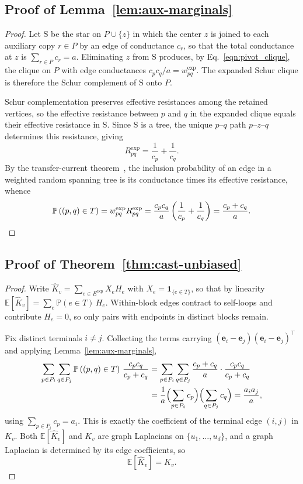 \documentclass{article}
\newcommand{\1}{\mathbbm{1}}
\theoremstyle{plain}
\renewcommand{\Pr}[1]{\mathbb{P}\left(#1\right)}
\begin{document}
\subsection{Proof of Lemma~\ref{lem:aux-marginals}}
\label{app:aux_marginals}
\begin{proof}
Let $\mathrm{S}$ be the star on $P\cup\{z\}$ in which the center $z$
is joined to each auxiliary copy $r\in P$ by an edge of conductance
$c_r$, so that the total conductance at $z$ is
$\sum_{r\in P}c_r=a$. Eliminating $z$ from $\mathrm{S}$ produces, by
Eq.~\eqref{eqn:pivot_clique}, the clique on $P$ with edge conductances
$c_pc_q/a=w^{\mathrm{exp}}_{pq}$. The expanded Schur clique is
therefore the Schur complement of $\mathrm{S}$ onto $P$.

Schur complementation preserves effective resistances among the
retained vertices, so the effective resistance between $p$ and $q$ in
the expanded clique equals their effective resistance in
$\mathrm{S}$. Since $\mathrm{S}$ is a tree, the unique $p$--$q$ path
$p$--$z$--$q$ determines this resistance, giving
\[
R_{pq}^{\mathrm{exp}} = \frac{1}{c_p}+\frac{1}{c_q}.
\]
By the transfer-current theorem~\cite{lyons2003determinantal}, the
inclusion probability of an edge in a weighted random spanning tree is
its conductance times its effective resistance, whence
\[
\Pr{(p,q)\in T}
= w_{pq}^{\mathrm{exp}}R_{pq}^{\mathrm{exp}}
= \frac{c_pc_q}{a}\left(\frac{1}{c_p}+\frac{1}{c_q}\right)
= \frac{c_p+c_q}{a}. \qedhere
\]
\end{proof}

\subsection{Proof of Theorem~\ref{thm:cast-unbiased}}
\label{app:thm_unbiasedness}
\begin{proof}
Write $\widehat K_v=\sum_{e\in E^{\mathrm{exp}}}X_e H_e$ with
$X_e=\mathbf 1_{\{e\in T\}}$, so that by linearity
$\mathbb E[\widehat K_v]=\sum_{e}\Pr{e\in T}\,H_e$. Within-block edges
contract to self-loops and contribute $H_e=0$, so only pairs with
endpoints in distinct blocks remain.

Fix distinct terminals $i\neq j$. Collecting the terms carrying
$(\mathbf e_i-\mathbf e_j)(\mathbf e_i-\mathbf e_j)^\top$ and applying
Lemma~\ref{lem:aux-marginals},
\[
\begin{aligned}
\sum_{p\in P_i}\sum_{q\in P_j}\Pr{(p,q)\in T}\,\frac{c_pc_q}{c_p+c_q}
&= \sum_{p\in P_i}\sum_{q\in P_j}
   \frac{c_p+c_q}{a}\cdot\frac{c_pc_q}{c_p+c_q} \\
&= \frac{1}{a}\Bigl(\sum_{p\in P_i}c_p\Bigr)
            \Bigl(\sum_{q\in P_j}c_q\Bigr)
 = \frac{a_ia_j}{a},
\end{aligned}
\]
using $\sum_{p\in P_i}c_p=a_i$. This is exactly the coefficient of the
terminal edge $(i,j)$ in $K_v$. Both $\mathbb E[\widehat K_v]$ and
$K_v$ are graph Laplacians on $\{u_1,\ldots,u_d\}$, and a graph
Laplacian is determined by its edge coefficients, so 
$$
\mathbb{E}[\widehat K_v]=K_v.
$$


\end{proof}
\end{document}
